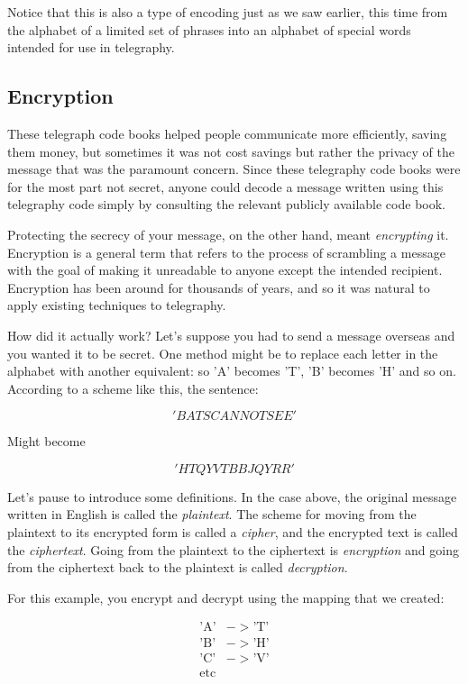\documentclass[UTF8]{book}
\begin{document}
\begin{CJK}{UTF8}{gbsn}
Notice that this is also a type of encoding just as we saw earlier, this time from the alphabet of a limited set of phrases into an alphabet of special words intended for use in telegraphy.

\subsection{Encryption}

These telegraph code books helped people communicate more efficiently, saving them money, but sometimes it was not cost savings but rather the privacy of the message that was the paramount concern. Since these telegraphy code books were for the most part not secret, anyone could decode a message written using this telegraphy code simply by consulting the relevant publicly available code book.

Protecting the secrecy of your message, on the other hand, meant \emph{encrypting} it. Encryption is a general term that refers to the process of scrambling a message with the goal of making it unreadable to anyone except the intended recipient. Encryption has been around for thousands of years, and so it was natural to apply existing techniques to telegraphy.

How did it actually work? Let's suppose you had to send a message overseas and you wanted it to be secret. One method might be to replace each letter in the alphabet with another equivalent: so 'A' becomes 'T', 'B' becomes 'H' and so on. According to a scheme like this, the sentence:

   \[ 'BATS CANNOT SEE' \]

Might become

   \[ 'HTQY VTBBJQ YRR' \]

Let's pause to introduce some definitions. In the case above, the original message written in English is called the \emph{plaintext}. The scheme for moving from the plaintext to its encrypted form is called a \emph{cipher}, and the encrypted text is called the \emph{ciphertext}. Going from the plaintext to the ciphertext is \emph{encryption} and going from the ciphertext back to the plaintext is called \emph{decryption}.

For this example, you encrypt and decrypt using the mapping that we created:

\begin{align*}
	\text{'A'} &-> \text{'T'} \\
	\text{'B'} &-> \text{'H'} \\
	\text{'C'} &-> \text{'V'} \\
        \text{etc}
\end{align*}


\end{CJK}
\end{document}
